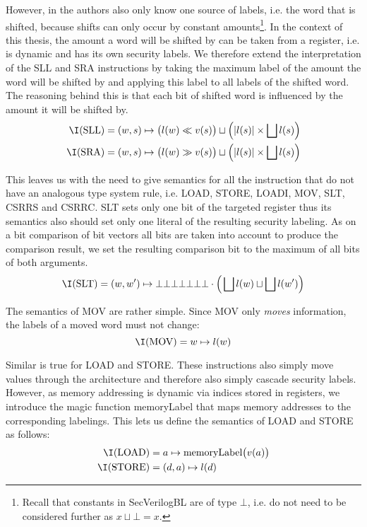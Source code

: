 However, in \cite{Ferraiuolo17} the authors also only know one source of labels, i.e. the word that is shifted, because shifts can only occur by constant amounts\footnote{%
    Recall that constants in SecVerilogBL are of type $ \bot $, i.e. do not need to be considered further as $ x \sqcup \bot = x $.
}.
In the context of this thesis, the amount a word will be shifted by can be taken from a register, i.e. is dynamic and has its own security labels.
We therefore extend the interpretation of the SLL and SRA instructions by taking the maximum label of the amount the word will be shifted by and applying this label to all labels of the shifted word.
The reasoning behind this is that each bit of shifted word is influenced by the amount it will be shifted by.
\begin{align*}
    \I(\text{SLL}) &= (w, s) \mapsto \big(l(w) \ll v(s) \big) \sqcup \Big(|l(s)| \times \bigsqcup l(s) \Big) \\
    \I(\text{SRA}) &= (w, s) \mapsto \big(l(w) \gg v(s) \big) \sqcup \Big(|l(s)| \times \bigsqcup l(s) \Big)
\end{align*}

This leaves us with the need to give semantics for all the instruction that do not have an analogous type system rule, i.e. LOAD, STORE, LOADI, MOV, SLT, CSRRS and CSRRC.
SLT sets only one bit of the targeted register thus its semantics also should set only one literal of the resulting security labeling.
As on a bit comparison of bit vectors all bits are taken into account to produce the comparison result, we set the resulting comparison bit to the maximum of all bits of both arguments.
\begin{equation*}
    \I(\text{SLT}) = (w, w') \mapsto \bot\bot\bot\bot\bot\bot\bot \cdot \Big(\bigsqcup l(w) \sqcup \bigsqcup l(w') \Big)
\end{equation*}

The semantics of MOV are rather simple.
Since MOV only \textit{moves} information, the labels of a moved word must not change:
\begin{equation*}
    \I(\text{MOV}) = w \mapsto l(w)
\end{equation*}

Similar is true for LOAD and STORE.
These instructions also simply move values through the architecture and therefore also simply cascade security labels.
However, as memory addressing is dynamic via indices stored in registers, we introduce the magic function memoryLabel that maps memory addresses to the corresponding labelings.
This lets us define the semantics of LOAD and STORE as follows:
\begin{align*}
    \I(\text{LOAD}) &= a \mapsto \text{memoryLabel}\big(v(a) \big) \\
    \I(\text{STORE}) &= (d, a) \mapsto l(d)
\end{align*}

